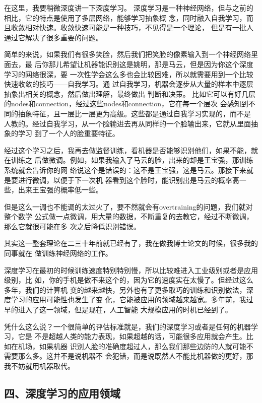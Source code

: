 \documentclass[11pt]{ctexart}
\begin{document}
{{{{在这里，我要稍微深度讲一下深度学习。
深度学习是一种神经网络，但与之前的相比，它的特点是使用了多层网络，能够学习抽象概
念，同时融入自我学习，而且收敛相对快速。收敛快速可能是一种技巧，不见得是一个理论，
但是有一批人通过它解决了很多重要的问题。

简单的来说，如果我们有很多笑脸，然后我们把笑脸的像素输入到一个神经网络里面去，最
后你那儿希望让机器能识别这是姚明，那是马云，但是因为你这个深度学习的网络很深，要
一次性学会这么多也会比较困难，所以就需要用到一个比较快速收敛的技巧——自我学习。通
过自我学习，机器会逐步从大量的样本中逐层抽象出相关的概念，然后做出理解，最终做出
判断和决策。
比如它可以有好几层的nodes和connection，经过这些nodes和connection，它在每一个层次
会感知到不同的抽象特征，且一层比一层更为高级。这些都是通过自我学习实现的，而不是
人教的。经过自我学习，从一个脸输进去再从同样的一个脸输出来，它就从里面抽象的学习
到了一个人的脸重要特征。

经过这个学习之后，我再去做监督训练，看机器是否能够识别他们，如果不能，就在训练之
后做微调。例如，如果我输入了马云的脸，出来的却是王宝强，那训练系统就会告诉你的网
络说这个是错误的：这不是王宝强，这是马云。那接下来就是要进行微调，以便于下一次机
器看到这个脸时，能识别出是马云的概率高一些，出来王宝强的概率低一些。

但是这么一调也不能调的太过火了，要不然就会有overtraining的问题，我们就对整个数学
公式做一点微调，用大量的数据，不断重复的去教它，经过不断微调，那么它就很可能在多
次之后降低识别错误。

其实这一整套理论在二三十年前就已经有了，我在做我博士论文的时候，很多我的同事就在
做训练神经网络的工作。

深度学习在最初的时候训练速度特别特别慢，所以比较难进入工业级别或者是应用级别，比
如，你的手机是做不来这个的，因为它的速度实在太慢了。但经过这么多年，我们的计算机
变的越来越快，另外也有了更多取巧的训练和识别做法，深度学习的应用可能性也发生了变
化，它能被应用的领域越来越宽。多年前，我过早的进入了这一领域，但是现在，人工智能
大规模应用的时机已经到了。

凭什么这么说？一个很简单的评估标准就是，我们的深度学习或者是任何的机器学习，它是
不是超越人类的能力表现，如果超越的话，可能很多应用就会产生。比如在机场，如果机器
识别人脸的准确度超过人，那么我们那些边防的人就可能不需要那么多。这并不是说机器不
会犯错，而是说既然人不能比机器做的更好，那我不妨就用机器取代。

\subsection{四、深度学习的应用领域}
\label{sec:orgd64fde7}

}}}}
\end{document}
